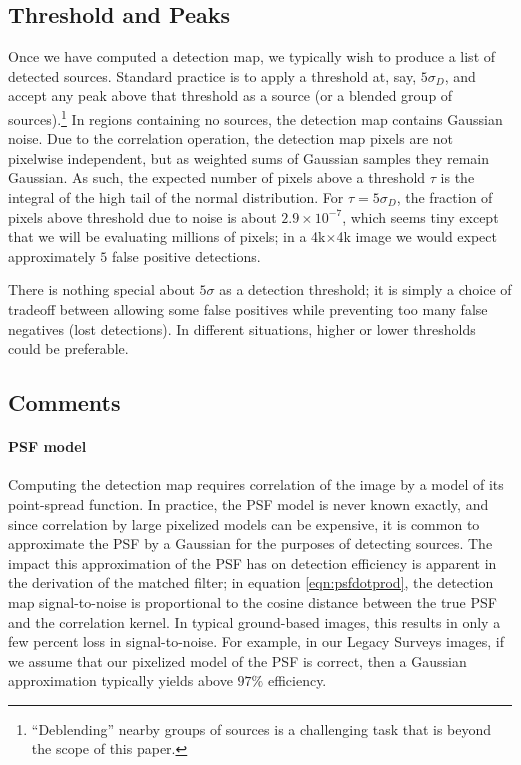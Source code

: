 \documentclass[letterpaper,preprint]{aastex62}
\begin{document}
\subsection{Threshold and Peaks}


Once we have computed a detection map, we typically wish to produce a
list of detected sources.  Standard practice is to apply a threshold
at, say, $5 \sigma_D$, and accept any peak above that threshold as a
source (or a blended group of sources).\footnote{%
  ``Deblending'' nearby groups of sources is a challenging task that
  is beyond the scope of this paper.}
In regions containing no
sources, the detection map contains Gaussian noise.  Due to the
correlation operation, the detection map pixels are not pixelwise
independent, but as weighted sums of Gaussian samples they remain
Gaussian.  As such, the expected number of pixels above a threshold
$\tau$ is the integral of the high tail of the normal distribution.
For $\tau = 5 \sigma_D$, the fraction of pixels above threshold due to
noise is about $2.9\times10^{-7}$, which seems tiny except that we
will be evaluating millions of pixels; in a 4k$\times$4k image we
would expect approximately $5$ false positive detections.

There is nothing special about $5 \sigma$ as a detection threshold; it
is simply a choice of tradeoff between allowing some false positives
while preventing too many false negatives (lost detections).  In
different situations, higher or lower thresholds could be preferable.

\subsection{Comments}

\paragraph{PSF model}
Computing the detection map requires correlation of the image by a
model of its point-spread function.  In practice, the PSF model is
never known exactly, and since correlation by large pixelized models
can be expensive, it is common to approximate the PSF by a Gaussian
for the purposes of detecting sources.  The impact this approximation
of the PSF has on detection efficiency is apparent in the derivation
of the matched filter; in equation \ref{eqn:psfdotprod}, the detection
map signal-to-noise is proportional to the cosine distance between the
true PSF and the correlation kernel.  In typical ground-based images,
this results in only a few percent loss in signal-to-noise.  For
example, in our Legacy Surveys images, if we assume that our pixelized
model of the PSF is correct, then a Gaussian approximation typically
yields above $97\%$ efficiency.
\end{document}
